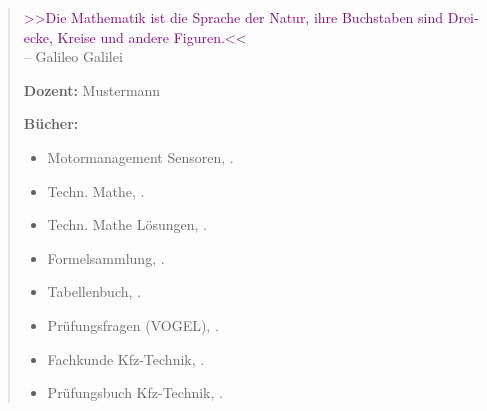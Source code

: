 \null\vfil
\begin{otherlanguage}{ngerman}
\begin{center}\textsf{\textbf{\abstractname}}\end{center}


    \begin{quote}
        \textcolor{purple}{>>Die Mathematik ist die Sprache der Natur, 
        ihre Buchstaben sind Dreiecke, Kreise und andere Figuren.<<}\\ 
        \raggedleft \small{-- Galileo Galilei}%
        
        \raggedright
        \textbf{Dozent:} Mustermann

        \textbf{Bücher:}

        \begin{itemize}
            \item Motormanagement Sensoren, \textcite{schneehage:2021:motormanagement}.
            \item Techn. Mathe, \textcite{elbl:2016:technMa}.
            \item Techn. Mathe Lösungen, \textcite{elbl:2017:technMaL}.        
            \item Formelsammlung, \textcite{bell:2020:formelsammlung}.
            \item Tabellenbuch, \textcite{bell:2021:tabellenbuchKfz}.
            \item Prüfungsfragen (VOGEL), \textcite{schluter:2021:prufungsfragenKfz}.
            \item Fachkunde Kfz-Technik, \textcite{brand:2020:fachkundeKfz}.
            \item Prüfungsbuch Kfz-Technik, \textcite{fischer:2010:prufungsbuchKfz}.
        \end{itemize}


    \end{quote}

\end{otherlanguage}
\vfil\null



